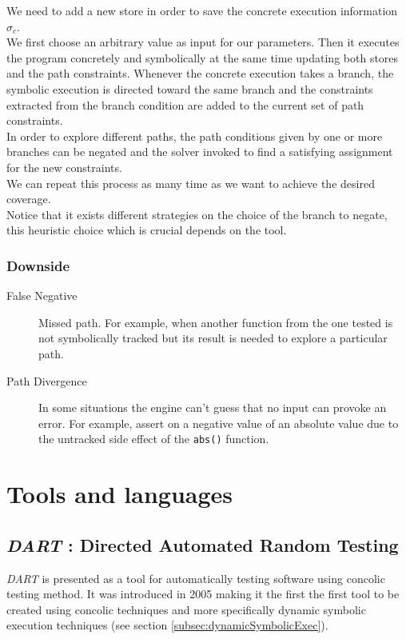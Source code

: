 \documentclass[11pt]{article}
\begin{document}
    			We need to add a new store in order to save the concrete execution information $\sigma_c$.\\
    			We first choose an arbitrary value as input for our parameters. Then it executes the program concretely and symbolically at the same time updating both stores and the path constraints. Whenever the concrete execution takes a branch, the symbolic execution is directed toward the same branch and the constraints extracted from the branch condition are added to the current set of path constraints.\\
    			In order to explore different paths, the path conditions given by one or more branches can be negated and the solver invoked to find a satisfying assignment for the new constraints.\\
    			We can repeat this process as many time as we want to achieve the desired coverage.\\
    			
    			Notice that it exists different strategies on the choice of the branch to negate, this heuristic choice which is crucial depends on the tool.\\
    		
    		\subsubsection*{Downside}
    			\begin{description}
    				\item[False Negative] Missed path. For example, when another function from the one tested is not symbolically tracked but its result is needed to explore a particular path.
    				\item[Path Divergence] In some situations the engine can't guess that no input can provoke an error. For example, assert on a negative value of an absolute value due to the untracked side effect of the \texttt{abs()} function.
    			\end{description}


  \section{Tools and languages}

    \subsection{\emph{DART} : Directed Automated Random Testing}
    \label{subsec:DART}
    	\emph{DART} is presented as a tool for automatically testing software using concolic testing method. It was introduced in 2005 making it the first the first tool to be created using concolic techniques and more specifically dynamic symbolic execution techniques (see section \ref{subsec:dynamicSymbolicExec}). \\
\end{document}
